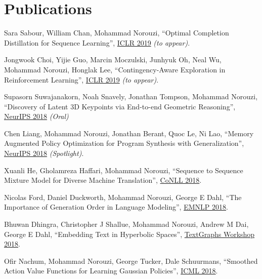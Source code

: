 \documentclass[10pt,letterpaper]{article}
\renewenvironment{itemize}{
  \begin{list}{}{
    \setlength{\leftmargin}{1.5em}
  }
}{
  \end{list}
}
\begin{document}
\section*{Publications}

\begin{itemize}

\item
Sara Sabour, William Chan, Mohammad Norouzi,
``Optimal Completion Distillation for Sequence Learning'',
\href{https://arxiv.org/pdf/1810.01398.pdf}{ICLR 2019} {\em (to appear)}.

\item
Jongwook Choi, Yijie Guo, Marcin Moczulski, Junhyuk Oh, Neal Wu, Mohammad Norouzi, Honglak Lee,
``Contingency-Aware Exploration in Reinforcement Learning'',
\href{https://arxiv.org/pdf/1811.01483.pdf}{ICLR 2019} {\em (to appear)}.


\item Supasorn Suwajanakorn, Noah Snavely, Jonathan Tompson, Mohammad Norouzi,
``Discovery of Latent 3D Keypoints via End-to-end Geometric Reasoning'',
\href{https://arxiv.org/pdf/1807.03146}{NeurIPS 2018} {\em (Oral)}

\item Chen Liang, Mohammad Norouzi, Jonathan Berant, Quoc Le, Ni Lao,
``Memory Augmented Policy Optimization for Program Synthesis with Generalization'',
\href{https://arxiv.org/pdf/1807.02322}{NeurIPS 2018} {\em (Spotlight)}.


\item Xuanli He, Gholamreza Haffari, Mohammad Norouzi,
``Sequence to Sequence Mixture Model for Diverse Machine Translation'',
\href{https://arxiv.org/pdf/1810.07391}{CoNLL 2018}.

\item Nicolas Ford, Daniel Duckworth, Mohammad Norouzi, George E Dahl,
``The Importance of Generation Order in Language Modeling'',
\href{https://arxiv.org/pdf/1808.07910}%
{EMNLP 2018}.

\item Bhuwan Dhingra, Christopher J Shallue, Mohammad Norouzi, Andrew M Dai, George E Dahl,
``Embedding Text in Hyperbolic Spaces'',
\href{https://arxiv.org/pdf/1806.04313.pdf}%
{TextGraphs Workshop 2018}.

\item Ofir Nachum, Mohammad Norouzi, George Tucker, Dale Schuurmans,
``Smoothed Action Value Functions for Learning Gaussian Policies'',
\href{https://arxiv.org/pdf/1803.02348}%
{ICML 2018}.


\end{itemize}
\end{document}
